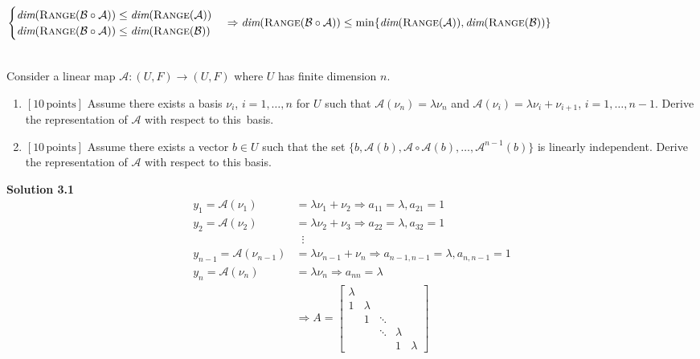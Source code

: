 \documentclass[a4paper,10.5pt]{article}
\def\dim{{\mbox{\em dim}}}
\def\range{{\mbox{\sc Range}}}
\newcommand{\A}{\mathcal{A}}
\newcommand{\B}{\mathcal{B}}
\begin{document}
$\begin{cases}
\dim(\range(\B \circ \A)) \leq \dim(\range(\A)) \\
\dim(\range(\B \circ \A)) \leq \dim(\range(\B))
\end{cases} \Rightarrow \dim(\range(\B \circ \A)) \leq \min \{\dim(\range(\A)),\dim(\range(\B))\}$

\clearpage

\\
Consider a linear map $\A:(U,F) \rightarrow (U,F)$
where $U$ has finite dimension $n$. 
\begin{enumerate}
	\item {\bf$[10\, \text{points}]$} Assume there exists a basis
	$\nu_i$, $i=1, \ldots, n$ for $U$ such that ${\mathcal A}(\nu_n)=\lambda
	\nu_n$ and ${\mathcal A}(\nu_i)=\lambda \nu_i+\nu_{i+1}$, $i=1, \ldots,
	n-1$. Derive the representation of ${\mathcal A}$ with respect to this~basis.
	\item {\bf$[10\, \text{points}]$} Assume there exists a vector $b
	\in U$ such that the set $\{b, {\mathcal A}(b), {\mathcal
		A}\circ {\mathcal A}(b), \ldots, {\mathcal A}^{n-1}(b)\}$ is linearly independent. Derive the representation of ${\mathcal A}$
	with respect to this basis.\\
\end{enumerate}

{\bf Solution 3.1}
\begin{align*}
y_1 = \A(\nu_1) &= \lambda \nu_1 + \nu_2 \Rightarrow a_{11} = \lambda, a_{21} = 1 \\
y_2 = \A(\nu_2) &= \lambda \nu_2 + \nu_3 \Rightarrow a_{22} = \lambda, a_{32} = 1\\
		  &\; \; \vdots \\
y_{n-1} = \A(\nu_{n-1}) &= \lambda \nu_{n-1} + \nu_n \Rightarrow a_{n-1,n-1} = \lambda, a_{n,n-1} = 1\\
y_n = \A(\nu_n) &= \lambda \nu_n \Rightarrow a_{nn} = \lambda \\
&\Rightarrow A = \left[\begin{matrix}
\lambda & & & & \\
1 & \lambda & & & \\
& 1 & \ddots & & \\
& & \ddots & \lambda & \\
& & & 1 & \lambda
\end{matrix}\right]
\end{align*}
\end{document}
